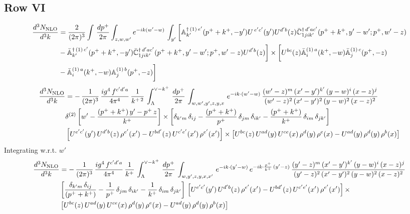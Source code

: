 \documentclass[9pt]{article}
\def\mf#1{\mathbb{#1}}
\numberwithin{equation}{section}
\begin{document}
\subsection{Row VI\,}
\begin{align}
     \frac{d^{3}N_{\rm NLO}}{d^{3}k} & =   \frac{2}{(2\pi)^{3}} \int\, \frac{dp^{+}}{2\pi}\int_{z,w,w^{\prime}} e^{-ik(w^{\prime}-w)}\, \int_{y^{\prime}}\bigg[\mf{A}^{\dagger\, (1)\,e^{\prime}}_{k^{\prime}}(p^{+}+k^{+},-y^{\prime})U^{\, e^{\prime}c^{\prime}}(y^{\prime})U^{d^{\prime}b}(z) \Bar{\mf{C}}^{\dagger\, d^{\prime}ac^{\prime}}_{1jik^{\prime}}(p^{+}+k^{+},y^{\prime}-w^{\prime}; p^{+},w^{\prime}-z) \notag \\ & -\Bar{\mf{A}}^{\dagger\, (1)\,c^{\prime}}_{k^{\prime}}(p^{+}+k^{+},-y^{\prime})\Bar{\mf{C}}^{\dagger\, d^{\prime}ac^{\prime}}_{1jik^{\prime}}(p^{+}+k^{+},y^{\prime}-w^{\prime}; p^{+},w^{\prime}-z)U^{d^{\prime}b}(z)\bigg] \times \bigg[U^{bc}(z)\Bar{\mf{A}}^{(1)\, a}_{i}(k^{+},- w)\Bar{\mf{A}}^{(1)\, c}_{j}(p^{+},-z)\notag \\ & -\Bar{\mf{A}}^{(1)\, a}_{i}(k^{+},- w) \mf{A}^{(1)\, b}_{j}(p^{+},- z)\bigg]\nonumber
\end{align}
\begin{align}
     \frac{d^{3}N_{\rm NLO}}{d^{3}k} & = -\, \frac{1}{(2\pi)^{3}}\,\frac{ig^{4}\,f^{c'd'a}}{4\pi^{4}}\, \frac{1}{k^{+\,2}}\,\int_{\Lambda}^{\vee-k^{+}}\, \frac{dp^{+}}{2\pi}\, \int_{w,w',y',z,y,x}\, e^{-ik\cdot (w'-w)}\, \frac{(w'-z)^{m}\,(x'-y')^{k'}\,(y-w)^{i}\,(x-z)^{j}}{(w'-z)^{2}\,(x'-y')^{2}\,(y-w)^{2}\,(x-z)^{2}}\notag \\ & \delta^{(2)}\left[w'-\frac{(p^{+}+k^{+})\,y'-p^{+}\,z}{k^{+}}\right]\times \left[\delta_{k'm}\,\delta_{ij}-\frac{(p^{+}+k^{+})}{p^{+}}\,\delta_{jm}\,\delta_{ik'}-\frac{(p^{+}+k^{+})}{k^{+}}\, \delta_{im}\, \delta_{jk'}\right]\notag \\ & \left[U^{e'c'}(y')\,U^{d'b}(z)\,\rho^{e'}(x')-U^{bd'}(z)\,U^{c'e'}(x')\,\rho^{e'}(x')\right]\times \left[U^{bc}(z)\,U^{ad}(y)\,U^{ce}(x)\,\rho^{d}(y)\,\rho^{e}(x)-U^{ad}(y)\,\rho^{d}(y)\,\rho^{b}(x)\right]
\end{align}
Integrating w.r.t. $w'$
\begin{align}
     \frac{d^{3}N_{\rm NLO}}{d^{3}k} & = -\,\frac{1}{(2\pi)^{3}}\, \frac{ig^{4}\,f^{c'd'a}}{4\pi^{4}}\, \frac{1}{k^{+}}\,\int_{\Lambda}^{\vee-k^{+}}\, \frac{dp^{+}}{2\pi}\, \int_{w,y',z,y,x,x'}\, e^{-ik\cdot (y'-w)}\, e^{-ik\cdot \frac{p^{+}}{k^{+}}\,(y'-z)}\,\frac{(y'-z)^{m}\,(x'-y')^{k'}\,(y-w)^{i}\,(x-z)^{j}}{(y'-z)^{2}\,(x'-y')^{2}\,(y-w)^{2}\,(x-z)^{2}}\notag \\ & \left[\frac{\delta_{k'm}\,\delta_{ij}}{(p^{+}+k^{+})}-\frac{1}{p^{+}}\,\delta_{jm}\,\delta_{ik'}-\frac{1}{k^{+}}\, \delta_{im}\, \delta_{jk'}\right]\, \left[U^{e'c'}(y')\,U^{d'b}(z)\,\rho^{e'}(x')-U^{bd'}(z)\,U^{c'e'}(x')\,\rho^{e'}(x')\right]\times\notag \\ &  \left[U^{bc}(z)\,U^{ad}(y)\,U^{ce}(x)\,\rho^{d}(y)\,\rho^{e}(x)-U^{ad}(y)\,\rho^{d}(y)\,\rho^{b}(x)\right]
\end{align}
\end{document}
